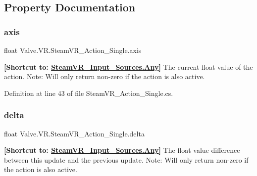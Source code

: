 \subsection{Property Documentation}
\mbox{\label{class_valve_1_1_v_r_1_1_steam_v_r___action___single_a31539f002182ea339ae7056f07987f8f}} 
\subsubsection{\texorpdfstring{axis}{axis}}
{\footnotesize\ttfamily float Valve.\+V\+R.\+Steam\+V\+R\+\_\+\+Action\+\_\+\+Single.\+axis\hspace{0.3cm}{\ttfamily [get]}}



{\bfseries{\mbox{[}Shortcut to\+: \mbox{\hyperlink{namespace_valve_1_1_v_r_a82e5bf501cc3aa155444ee3f0662853faed36a1ef76a59ee3f15180e0441188ad}{Steam\+V\+R\+\_\+\+Input\+\_\+\+Sources.\+Any}}\mbox{]}}} The current float value of the action. Note\+: Will only return non-\/zero if the action is also active. 



Definition at line 43 of file Steam\+V\+R\+\_\+\+Action\+\_\+\+Single.\+cs.

\mbox{\label{class_valve_1_1_v_r_1_1_steam_v_r___action___single_ab851061c00607a9fabe39db21cd00ac0}} 
\subsubsection{\texorpdfstring{delta}{delta}}
{\footnotesize\ttfamily float Valve.\+V\+R.\+Steam\+V\+R\+\_\+\+Action\+\_\+\+Single.\+delta\hspace{0.3cm}{\ttfamily [get]}}



{\bfseries{\mbox{[}Shortcut to\+: \mbox{\hyperlink{namespace_valve_1_1_v_r_a82e5bf501cc3aa155444ee3f0662853faed36a1ef76a59ee3f15180e0441188ad}{Steam\+V\+R\+\_\+\+Input\+\_\+\+Sources.\+Any}}\mbox{]}}} The float value difference between this update and the previous update. Note\+: Will only return non-\/zero if the action is also active. 



